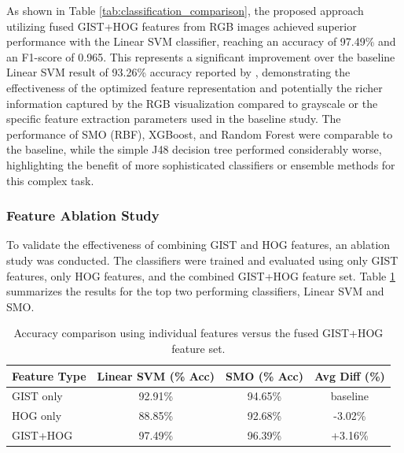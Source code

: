 As shown in Table \ref{tab:classification_comparison}, the proposed approach utilizing fused GIST+HOG features from RGB images achieved superior performance with the Linear SVM classifier, reaching an accuracy of 97.49\% and an F1-score of 0.965. This represents a significant improvement over the baseline Linear SVM result of 93.26\% accuracy reported by \cite{bozkir2021catch}, demonstrating the effectiveness of the optimized feature representation and potentially the richer information captured by the RGB visualization compared to grayscale or the specific feature extraction parameters used in the baseline study. The performance of SMO (RBF), XGBoost, and Random Forest were comparable to the baseline, while the simple J48 decision tree performed considerably worse, highlighting the benefit of more sophisticated classifiers or ensemble methods for this complex task.

\subsubsection{Feature Ablation Study}
\label{subsubsec:ablation}

To validate the effectiveness of combining GIST and HOG features, an ablation study was conducted. The classifiers were trained and evaluated using only GIST features, only HOG features, and the combined GIST+HOG feature set. Table \ref{tab:ablation_study} summarizes the results for the top two performing classifiers, Linear SVM and SMO.

\begin{table}[h!]
  \centering
  \captionsetup{labelformat=empty, textformat=simple}
  \caption{TABLE II: FEATURE ABLATION STUDY RESULTS}
  \label{tab:ablation_study}
  \begin{tabular}{lccc}
    \toprule
    \textbf{Feature Type} & \textbf{Linear SVM (\% Acc)} & \textbf{SMO (\% Acc)} & \textbf{Avg Diff (\%)} \\
    \midrule
    GIST only    & 92.91\% & 94.65\% & baseline \\
    HOG only     & 88.85\% & 92.68\% & -3.02\% \\
    GIST+HOG     & 97.49\% & 96.39\% & +3.16\% \\
    \bottomrule
  \end{tabular}
    \vspace{0.2cm} %
    \caption*{Accuracy comparison using individual features versus the fused GIST+HOG feature set.} %
\end{table}

